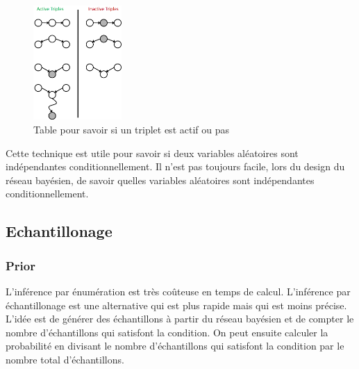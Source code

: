 \begin{figure}[H]
    \begin{center}
        \includegraphics[width=0.3\textwidth]{../pictures/triplet.png}
    \end{center}
    \caption{Table pour savoir si un triplet est actif ou pas}\label{fig:triplet}
\end{figure}

\begin{remark}\leavevmode
    Cette technique est utile pour savoir si deux variables aléatoires sont indépendantes conditionnellement. 
    Il n'est pas toujours facile, lors du design du réseau bayésien, de savoir quelles variables aléatoires sont indépendantes conditionnellement.
\end{remark}


\subsection{Echantillonage} %
\label{sub:echantillonage}

\subsubsection{Prior} %
\label{sec:prior}

\begin{remark}\leavevmode
    L'inférence par énumération est très coûteuse en temps de calcul.
    L'inférence par échantillonage est une alternative qui est plus rapide mais qui est moins précise.
    L'idée est de générer des échantillons à partir du réseau bayésien et de compter le nombre d'échantillons qui satisfont la condition.
    On peut ensuite calculer la probabilité en divisant le nombre d'échantillons qui satisfont la condition par le nombre total d'échantillons. 
\end{remark}

